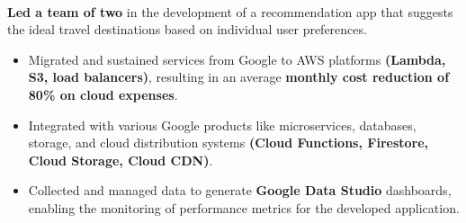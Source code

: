 \\
\textbf{Led a team of two} in the development of a recommendation app that suggests the ideal travel destinations based on individual user preferences.
\begin{itemize}
  \item Migrated and sustained services from Google to AWS platforms \textbf{(Lambda, S3, load balancers)}, resulting in an average \textbf{monthly cost reduction of 80\% on cloud expenses}.
  \item Integrated with various Google products like microservices, databases, storage, and cloud distribution systems \textbf{(Cloud Functions, Firestore, Cloud Storage, Cloud CDN)}.
  \item Collected and managed data to generate \textbf{Google Data Studio} dashboards, enabling the monitoring of performance metrics for the developed application.
\end{itemize}
